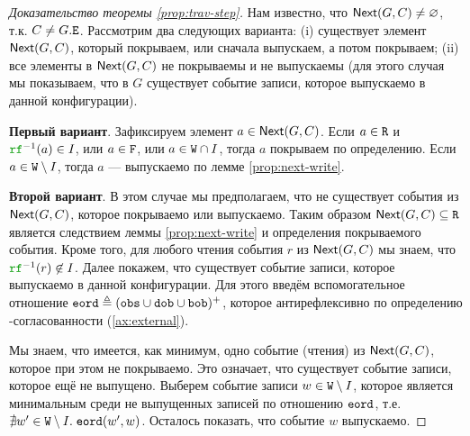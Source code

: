 \begin{proof}[Доказательство теоремы \ref{prop:trav-step}]
  Нам известно, что ${\sf Next}(G, C) \neq \varnothing$, т.к. $C \neq G.{\mathtt{E}}$.
  Рассмотрим два следующих варианта: (i) существует
  элемент ${\sf Next}(G, C)$, который покрываем, или сначала выпускаем, а потом покрываем; (ii) 
  все элементы в ${\sf Next}(G, C)$ не покрываемы и не выпускаемы
  (для этого случая мы показываем, что в $G$ существует событие записи, которое выпускаемо в данной конфигурации).

  {\bf Первый вариант}.
  Зафиксируем элемент $a \in {\sf Next}(G, C)$.
  Если $a \in {\mathtt{R}}$ и $\lRF^{-1}(a) \in \IssuedSet$, или $a \in {\mathtt{F}}$, или $a \in {\mathtt{W}} \cap I$,
  тогда $a$ покрываем по определению.
  Если $a \in {\mathtt{W}} \setminus I$, тогда $a$ --- выпускаемо по лемме \ref{prop:next-write}.

  {\bf Второй вариант}.
  В этом случае мы предполагаем, что не существует  события из ${\sf Next}(G, C)$, которое покрываемо или выпускаемо.
  Таким образом ${\sf Next}(G, C) \subseteq {\mathtt{R}}$ является следствием леммы \ref{prop:next-write} и определения покрываемого события.
  Кроме того, для любого чтения события $r$ из ${\sf Next}(G, C)$ мы знаем, что $\lRF^{-1}(r) \nin \IssuedSet$.
  Далее покажем, что существует событие записи, которое выпускаемо в данной конфигурации.
  Для этого введём вспомогательное отношение ${\mathtt{eord}} \triangleq ({\mathtt{obs}} \cup {\mathtt{dob}} \cup {\mathtt{bob}})^{+}$,
  которое антирефлексивно по определению \ARM-согласованности (\ref{ax:external}).
  
  Мы знаем, что имеется, как минимум, одно событие (чтения) из ${\sf Next}(G, C)$, которое при этом не покрываемо.
  Это означает, что существует событие записи, которое ещё не выпущено.
  Выберем событие записи $w \in {\mathtt{W}} \setminus I$, которое является минимальным среди не выпущенных записей по отношению ${\mathtt{eord}}$,
т.е. $\nexists w' \in {\mathtt{W}} \setminus I. \; {\mathtt{eord}}(w', w)$.
  Осталось показать, что событие $w$ выпускаемо.
  

\end{proof}
